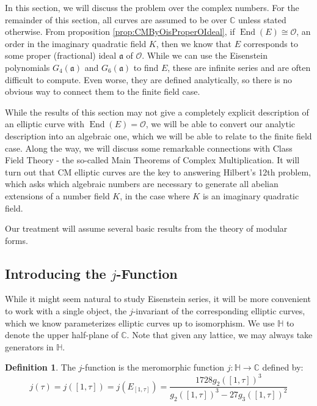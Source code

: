 \documentclass{amsart}
\theoremstyle{definition}
\newtheorem{definition}[thm]{Definition}
\theoremstyle{remark}
\numberwithin{equation}{section}
\newcommand{\cO}{\mathcal O}
\newcommand{\fka}{\mathfrak a}
\newcommand{\bbC}{\mathbb C}
\newcommand{\bbH}{\mathbb H}
\DeclareMathOperator{\End}{End}
\begin{document}
 In this section, we will discuss the problem over the complex numbers. For the remainder of this section, all curves are assumed to be over $\bbC$ unless stated otherwise. From proposition \ref{prop:CMByOisProperOIdeal},
 if $\End(E) \cong \cO$, an order in the imaginary quadratic field $K$, then we know that $E$ corresponds to some proper (fractional) ideal $\fka$ of $\cO$. While we can use the Eisenstein polynomials $G_{4}(\fka)$ and $G_{6}(\fka)$ to find $E$, these are infinite series and are often difficult to compute. Even worse, they are defined analytically, so there is no obvious way to connect them to the finite field case.
 
 While the results of this section may not give a completely explicit description of an elliptic curve with $\End(E) = \cO$, we will be able to convert our analytic description into an algebraic one, which we will be able to relate to the finite field case. Along the way, we will discuss some remarkable connections with Class Field Theory - the so-called Main Theorems of Complex Multiplication. It will turn out that CM elliptic curves are the key to answering Hilbert's 12th problem, which asks which algebraic numbers are necessary to generate all abelian extensions of a number field $K$, in the case where $K$ is an imaginary quadratic field. 
 
 Our treatment will assume several basic results from the theory of modular forms.

\subsection{Introducing the $j$-Function}

 While it might seem natural to study Eisenstein series, it will be more convenient to work with a single object, the $j$-invariant of the corresponding elliptic curves, which we know parameterizes elliptic curves up to isomorphism. We use $\bbH$ to denote the upper half-plane of $\bbC$. Note that given any lattice, we may always take generators in $\bbH$.
 
 \begin{definition}
 The $j$-function is the meromorphic function $j: \bbH \to \bbC$ defined by:
 \[
 j(\tau) = j([1, \tau]) = j(E_{[1, \tau]}) = \frac{1728 g_{2}([1,\tau])^3}{g_2([1,\tau])^3 - 27 g_{3}([1,\tau])^2}
 \]
 \end{definition}
\end{document}
